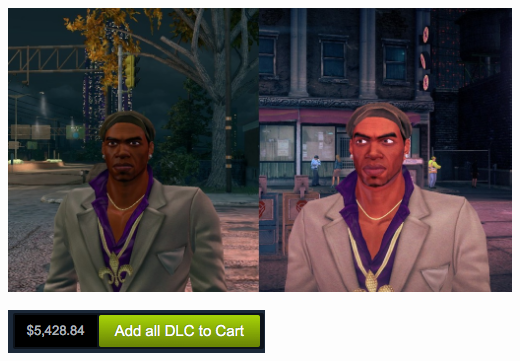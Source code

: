 \documentclass{beamer}
\begin{document}
\begin{frame}
\begin{enumerate}
\begin{columns}[T]
\hspace{-1.8cm}

\begin{column}{0.5\textwidth}
\pause
\includegraphics[scale=0.1]{p3vp4}
\pause

\vspace{0.2cm}

\includegraphics[scale=0.4]{train_sim_dlc}
\end{column}

\hspace{-2cm}

\end{columns}
\end{enumerate}
\end{frame}
\end{document}
